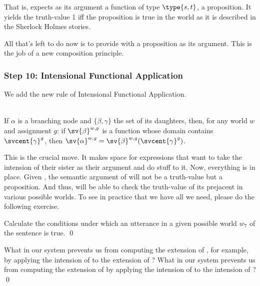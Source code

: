 That is,  expects as its argument a
function of type $\type{s,t}$, a proposition. It yields the truth-value 1 iff
the proposition is true in the world as it is described in the Sherlock Holmes
stories.

All that's left to do now is to provide  with a proposition as its argument. This is the job of a new
composition principle.

\subsubsection{Step 10: Intensional Functional Application}
\label{sec:intens-funct-appl}

We add the new rule of Intensional Functional Application.

\ex {}\\
%
If $\alpha$ is a branching node and $\{\beta, \gamma\}$ the set of its
daughters, then, for any world $w$ and assignment $g$: if $\sv{\beta}^{w,g}$ is
a function whose domain contains $\svcent{\gamma}^g$, then
$\sv{\alpha}^{w,g} = \sv{\beta}^{w,g} (\svcent{\gamma}^g)$. \xe

This is the crucial move. It makes space for expressions that want to take the
intension of their sister as their argument and do stuff to it. Now, everything
is in place. Given \LLast, the semantic argument of  will not be a truth-value but a proposition. And thus,
 will be able to check the
truth-value of its prejacent in various possible worlds. To see in practice that
we have all we need, please do the following exercise.

\begin{exercise}
  Calculate the conditions under which an utterance in a given possible world
  $w_7$ of the sentence  is true. \qed
\end{exercise}

\begin{exercise}
  What in our system prevents us from computing the extension of
  , for example, by applying the intension of
   to the extension of ? What in our system
  prevents us from computing the extension of  by
  applying the intension of  to the intension of
  ? \qed
\end{exercise}

